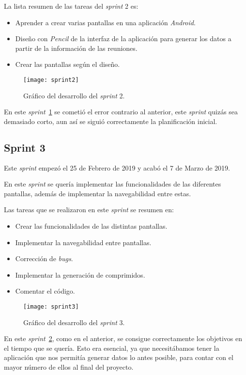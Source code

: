 La lista resumen de las tareas del \textit{sprint} 2 es:
\begin{itemize}
	\item Aprender a crear varias pantallas en una aplicación \textit{Android}.
	\item Diseño con \textit{Pencil} de la interfaz de la aplicación para generar los datos a partir de la información de las reuniones.
	\item Crear las pantallas según el diseño.
\end{itemize}

\begin{figure}
	\centering
	\texttt{[image: sprint2]}
	\caption{Gráfico del desarrollo del \textit{sprint} 2.}
	\label{fig:sprint2}
\end{figure}

En este \textit{sprint}~\ref{fig:sprint2} se cometió el error contrario al anterior, este \textit{sprint} quizás sea demasiado corto, aun así se siguió correctamente la planificación inicial.

\subsection{Sprint 3}
Este \textit{sprint} empezó el 25 de Febrero de 2019 y acabó el 7 de Marzo de 2019.

En este \textit{sprint} se quería implementar las funcionalidades de las diferentes pantallas, además de implementar la navegabilidad entre estas.

Las tareas que se realizaron en este \textit{sprint} se resumen en:
\begin{itemize}
	\item Crear las funcionalidades de las distintas pantallas.
	\item Implementar la navegabilidad entre pantallas.
	\item Corrección de \textit{bugs}.
	\item Implementar la generación de comprimidos.
	\item Comentar el código.
\end{itemize}

\begin{figure}
	\centering
	\texttt{[image: sprint3]}
	\caption{Gráfico del desarrollo del \textit{sprint} 3.}
	\label{fig:sprint3}
\end{figure}

En este \textit{sprint}~\ref{fig:sprint3}, como en el anterior, se consigue correctamente los objetivos en el tiempo que se quería. Esto era esencial, ya que necesitábamos tener la aplicación que nos permitía generar datos lo antes posible, para contar con el mayor número de ellos al final del proyecto.

